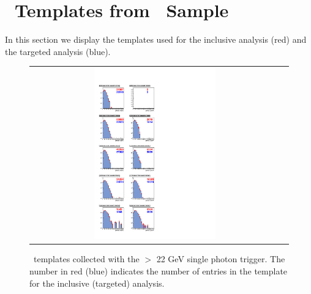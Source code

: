 \clearpage

\section{\MET\ Templates from \gjets\ Sample}
\label{app:templates}

In this section we display the templates used for the inclusive analysis (red) and the targeted analysis (blue).

\begin{figure}[!h]
\begin{center}
\begin{tabular}{cc}
\includegraphics[width=0.5\textwidth]{plots/template_targeted_0_19fb.pdf}
\end{tabular}
\caption{
\MET\ templates collected with the \pt $>$ 22 GeV single photon trigger.
The number in red (blue) indicates the number of entries in the template for the inclusive (targeted) analysis.
}
\end{center}
\end{figure}

\clearpage

